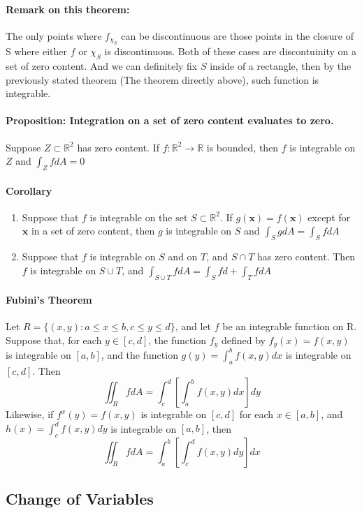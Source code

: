 \documentclass[11pt]{article}
\newcommand{\bx}[0]{\mathbf{x}}
\newcommand{\real}[0]{\mathbb{R}}
\begin{document}
\paragraph{Remark on this theorem:} The only points where $f_{\chi_S}$ can be discontinuous are those points in the closure of S where either $f$ or $\chi_S$ is discontinuous. Both of these cases are discontuinity on a set of zero content. And we can definitely fix $S$ inside of a rectangle, then by the previously stated theorem (The theorem directly above), such function is integrable.

\paragraph{Proposition: Integration on a set of zero content evaluates to zero.} Suppose $Z\subset \real^2$ has zero content. If $f:\real^2\rightarrow{} \real$ is bounded, then $f$ is integrable on $Z$ and $\int_Z fdA = 0$

\paragraph{Corollary}
\begin{enumerate}
    \item Suppose that $f$ is integrable on the set $S\subset \real^2$. If $g(\bx) = f(\bx)$ except for $\bx$ in a set of zero content, then $g$ is integrable on $S$ and $\int_S gdA = \int_S fdA$
    \item Suppose that $f$ is integrable on $S$ and on $T$, and $S\cap T$ has zero content. Then $f$ is integrable on $S\cup T$, and $\int_{S\cup T}fdA = \int_Sfd+ \int_TfdA$
\end{enumerate}
\paragraph{Fubini's Theorem} Let $R = \{(x,y): a\leq x\leq b, c \leq y \leq d \}$, and let $f$ be an integrable function on R. Suppose that, for each $y \in [c, d]$, the function $f_y$ defined by $f_y(x) = f(x, y)$ is integrable on $[a,b]$, and the function $g(y) = \int_a^bf(x,y)dx$ is integrable on $[c,d]$. Then
$$\iint_R fdA = \int_c^d\left[\int_a^b f(x,y)dx\right]dy$$
Likewise, if $f^x(y) = f(x,y)$ is integrable on $[c,d]$ for each $x \in [a,b]$, and $h(x) = \int_c^df(x,y)dy$ is integrable on $[a,b]$, then
$$\iint_R fdA = \int_a^b\left[\int_c^d f(x,y)dy\right]dx$$

\subsection{Change of Variables}
\end{document}
